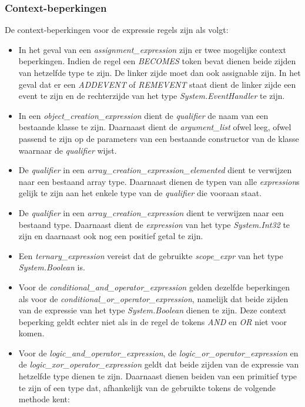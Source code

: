 
\subsubsection{Context-beperkingen}
De context-beperkingen voor de expressie regels zijn als volgt:

\begin{itemize}
	\item In het geval van een \textit{assignment\_expression} zijn er twee mogelijke context beperkingen. Indien de regel een \textit{BECOMES} token bevat dienen beide zijden van hetzelfde type te zijn. De linker zijde moet dan ook assignable zijn. In het geval dat er een \textit{ADDEVENT} of \textit{REMEVENT} staat dient de linker zijde een event te zijn en de rechterzijde van het type \textit{System.EventHandler} te zijn.
	\item In een \textit{object\_creation\_expression} dient de \textit{qualifier} de naam van een bestaande klasse te zijn. Daarnaast dient de \textit{argument\_list} ofwel leeg, ofwel passend te zijn op de parameters van een bestaande constructor van de klasse waarnaar de \textit{qualifier} wijst.
	\item De \textit{qualifier} in een \textit{array\_creation\_expression\_elemented} dient te verwijzen naar een bestaand array type. Daarnaast dienen de typen van alle \textit{expression}s gelijk te zijn aan het enkele type van de \textit{qualifier} die vooraan staat.
	\item De \textit{qualifier} in een \textit{array\_creation\_expression} dient te verwijzen naar een bestaand type. Daarnaast dient de \textit{expression} van het type \textit{System.Int32} te zijn en daarnaast ook nog een positief getal te zijn.
	\item Een \textit{ternary\_expression} vereist dat de gebruikte \textit{scope\_expr} van het type \textit{System.Boolean} is.
	\item Voor de \textit{conditional\_and\_operator\_expression} gelden dezelfde beperkingen als voor de \textit{conditional\_or\_operator\_expression}, namelijk dat beide zijden van de expressie van het type \textit{System.Boolean} dienen te zijn. Deze context beperking geldt echter niet als in de regel de tokens \textit{AND} en \textit{OR} niet voor komen.
	\item Voor de \textit{logic\_and\_operator\_expression}, de \textit{logic\_or\_operator\_expression} en de \textit{logic\_xor\_operator\_expression} geldt dat beide zijden van de expressie van hetzelfde type dienen te zijn. Daarnaast dienen beiden van een primitief type te zijn of een type dat, afhankelijk van de gebruikte tokens de volgende methode kent:

\end{itemize}
